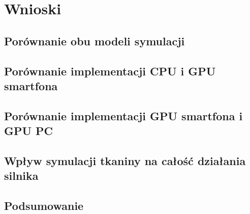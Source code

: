 \chapter{Wnioski}
\label{t:wnioski}

	\section{Porównanie obu modeli symulacji}
	\label{t:wnioski:porownanie}
	
	\section{Porównanie implementacji CPU i GPU smartfona}
	\label{t:wnioski:cpu_vs_gpu}
	
	\section{Porównanie implementacji GPU smartfona i GPU PC}
	\label{t:wnioski:andro_vs_pc}
	
	\section{Wpływ symulacji tkaniny na całość działania silnika}
	\label{t:wnioski:wplyw}
	
	\section{Podsumowanie}
	\label{t:wnioski:podsumowanie}

